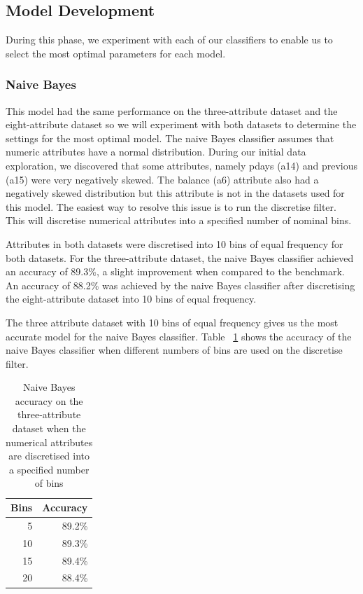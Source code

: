 \documentclass[a4paper,11pt]{article}
\begin{document}
\subsection{Model Development}

During this phase, we experiment with each of our classifiers to enable us to select the most optimal parameters
for each model.

\subsubsection{Naive Bayes}

This model had the same performance on the three-attribute dataset and the eight-attribute dataset so we will
experiment with both datasets to determine the settings for the most optimal model. The naive Bayes classifier
assumes that numeric attributes have a normal distribution. During our initial data exploration, we discovered
that some attributes, namely pdays (a14) and previous (a15) were very negatively skewed. The balance (a6) attribute
also had a negatively skewed distribution but this attribute is not in the datasets used for this model. The
easiest way to resolve this issue is to run the discretise filter. This will discretise numerical attributes into
a specified number of nominal bins.

Attributes in both datasets were discretised into 10 bins of equal frequency for both datasets. For the three-attribute
dataset, the naive Bayes classifier achieved an accuracy of 89.3\%, a slight improvement when compared to the benchmark.
An accuracy of 88.2\% was achieved by the naive Bayes classifier after discretising the eight-attribute dataset into
10 bins of equal frequency.

The three attribute dataset with 10 bins of equal frequency gives us the most accurate model for the naive Bayes
classifier. Table ~\ref{tab:naiveBayesBins} shows the accuracy of the naive Bayes classifier when different numbers of
bins are used on the discretise filter. 

\begin{table}[H]
  \begin{center}
    \begin{tabular}{r | r}
      Bins & Accuracy  \\ \hline
      5 & 89.2\% \\
      10 & 89.3\% \\
      15 & 89.4\% \\
      20 & 88.4\% \\
    \end{tabular}
  \end{center}
  \caption{Naive Bayes accuracy on the three-attribute dataset when the numerical attributes are discretised
  into a specified number of bins}
  \label{tab:naiveBayesBins}
\end{table}
\end{document}
